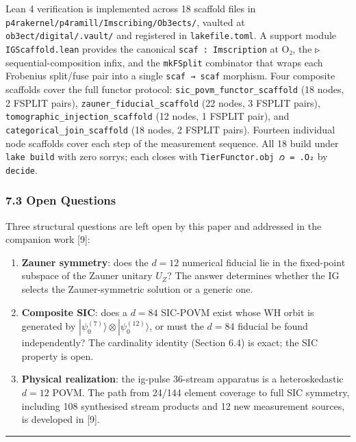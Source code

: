 \documentclass[12pt,a4paper]{article}
\begin{document}
Lean 4 verification is implemented across 18 scaffold files in
\texttt{p4rakernel/p4ramill/Imscribing/Ob3ects/}, vaulted at
\texttt{ob3ect/digital/.vault/} and registered in
\texttt{lakefile.toml}. A support module \texttt{IGScaffold.lean}
provides the canonical \texttt{scaf\ :\ Imscription} at O₂, the
\texttt{▷} sequential-composition infix, and the \texttt{mkFSplit}
combinator that wraps each Frobenius split/fuse pair into a single
\texttt{scaf\ →\ scaf} morphism. Four composite scaffolds cover the full
functor protocol: \texttt{sic\_povm\_functor\_scaffold} (18 nodes, 2
FSPLIT pairs), \texttt{zauner\_fiducial\_scaffold} (22 nodes, 3 FSPLIT
pairs), \texttt{tomographic\_injection\_scaffold} (12 nodes, 1 FSPLIT
pair), and \texttt{categorical\_join\_scaffold} (18 nodes, 2 FSPLIT
pairs). Fourteen individual node scaffolds cover each step of the
measurement sequence. All 18 build under \texttt{lake\ build} with zero
sorrys; each closes with \texttt{TierFunctor.obj\ 𐑼\ =\ .O₂} by
\texttt{decide}.

\hypertarget{open-questions}{%
\subsubsection{7.3 Open Questions}\label{open-questions}}

Three structural questions are left open by this paper and addressed in
the companion work {[}9{]}:

\begin{enumerate}
\def\labelenumi{\arabic{enumi}.}
\item
  \textbf{Zauner symmetry}: does the \(d=12\) numerical fiducial lie in
  the fixed-point subspace of the Zauner unitary \(U_Z\)? The answer
  determines whether the IG selects the Zauner-symmetric solution or a
  generic one.
\item
  \textbf{Composite SIC}: does a \(d=84\) SIC-POVM exist whose WH orbit
  is generated by
  \(|\psi_0^{(7)}\rangle \otimes |\psi_0^{(12)}\rangle\), or must the
  \(d=84\) fiducial be found independently? The cardinality identity
  (Section 6.4) is exact; the SIC property is open.
\item
  \textbf{Physical realization}: the ig-pulse 36-stream apparatus is a
  heteroskedastic \(d=12\) POVM. The path from 24/144 element coverage
  to full SIC symmetry, including 108 synthesised stream products and 12
  new measurement sources, is developed in {[}9{]}.
\end{enumerate}

\begin{center}\rule{0.5\linewidth}{0.5pt}\end{center}
\end{document}
